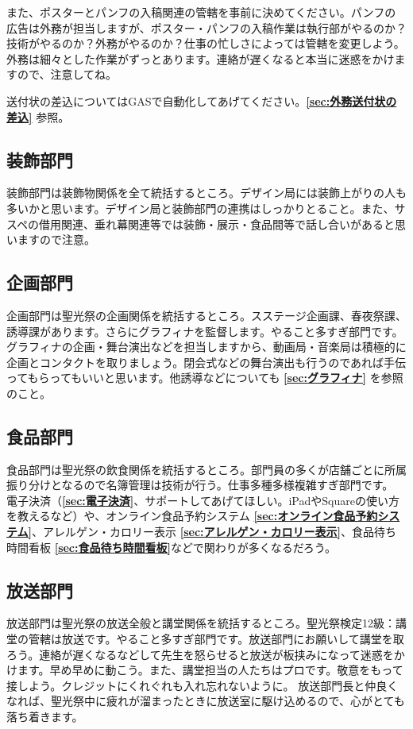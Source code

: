 \documentclass[dvipdfmx,jb5]{jreport}
\begin{document}
また、ポスターとパンフの入稿関連の管轄を事前に決めてください。パンフの広告は外務が担当しますが、ポスター・パンフの入稿作業は執行部がやるのか？技術がやるのか？外務がやるのか？仕事の忙しさによっては管轄を変更しよう。外務は細々とした作業がずっとあります。連絡が遅くなると本当に迷惑をかけますので、注意してね。

送付状の差込についてはGASで自動化してあげてください。{\bf \ref{sec:外務送付状の差込}} 参照。

\subsection{装飾部門}
装飾部門は装飾物関係を全て統括するところ。デザイン局には装飾上がりの人も多いかと思います。デザイン局と装飾部門の連携はしっかりとること。また、サスペの借用関連、垂れ幕関連等では装飾・展示・食品間等で話し合いがあると思いますので注意。

\subsection{企画部門}
企画部門は聖光祭の企画関係を統括するところ。スステージ企画課、春夜祭課、誘導課があります。さらにグラフィナを監督します。やること多すぎ部門です。
グラフィナの企画・舞台演出などを担当しますから、動画局・音楽局は積極的に企画とコンタクトを取りましょう。閉会式などの舞台演出も行うのであれば手伝ってもらってもいいと思います。他誘導などについても {\bf \ref{sec:グラフィナ}} を参照のこと。

\subsection{食品部門}
食品部門は聖光祭の飲食関係を統括するところ。部門員の多くが店舗ごとに所属振り分けとなるので名簿管理は技術が行う。仕事多種多様複雑すぎ部門です。
電子決済（{\bf \ref{sec:電子決済}}、サポートしてあげてほしい。iPadやSquareの使い方を教えるなど）や、オンライン食品予約システム {\bf \ref{sec:オンライン食品予約システム}}、アレルゲン・カロリー表示 {\bf \ref{sec:アレルゲン・カロリー表示}}、食品待ち時間看板 {\bf \ref{sec:食品待ち時間看板}}などで関わりが多くなるだろう。

\subsection{放送部門}
放送部門は聖光祭の放送全般と講堂関係を統括するところ。聖光祭検定12級：講堂の管轄は放送です。やること多すぎ部門です。放送部門にお願いして講堂を取ろう。連絡が遅くなるなどして先生を怒らせると放送が板挟みになって迷惑をかけます。早め早めに動こう。また、講堂担当の人たちはプロです。敬意をもって接しよう。クレジットにくれぐれも入れ忘れないように。
放送部門長と仲良くなれば、聖光祭中に疲れが溜まったときに放送室に駆け込めるので、心がとても落ち着きます。
\end{document}
